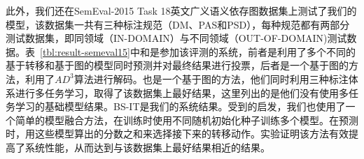 此外，我们还在SemEval-2015 Task 18英文广义语义依存图数据集上测试了我们的模型，该数据集一共有三种标注规范（DM、PAS和PSD），每种规范都有两部分测试数据集，即同领域（IN-DOMAIN）与不同领域（OUT-OF-DOMAIN)测试数据。表~\ref{tbl:result-semeval15}中和是参加该评测的系统，前者是利用了多个不同的基于转移和基于图的模型同时预测并对最终结果进行投票，后者是一个基于图的方法，利用了$AD^3$算法进行解码。也是一个基于图的方法，他们同时利用三种标注体系进行多任务学习，取得了该数据集上最好结果，这里列出的是他们没有使用多任务学习的基础模型结果。BS-IT是我们的系统结果。受到的启发，我们也使用了一个简单的模型融合方法，在训练时使用不同随机初始化种子训练多个模型。在预测时，用这些模型算出的分数之和来选择接下来的转移动作。实验证明该方法有效提高了系统性能，从而达到与该数据集上最好结果相近的结果。
